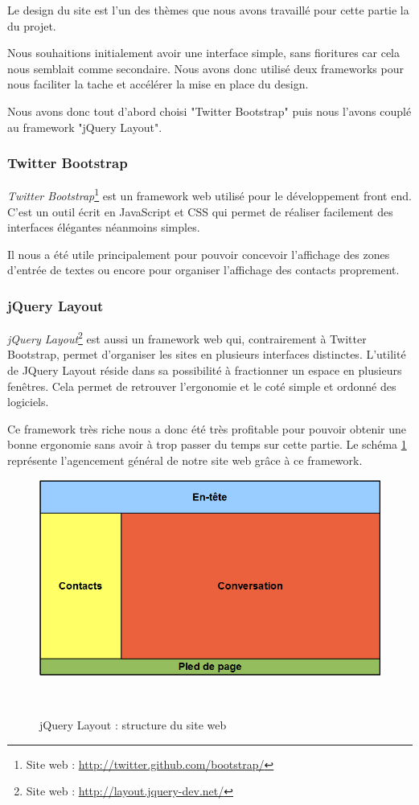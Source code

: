 Le design du site est l'un des thèmes que nous avons travaillé pour cette partie la du projet.

Nous souhaitions initialement avoir une interface simple, sans fioritures car cela nous semblait comme
secondaire. Nous avons donc utilisé deux frameworks pour nous faciliter la tache et accélérer la mise
en place du design.

Nous avons donc tout d'abord choisi "Twitter Bootstrap" puis nous l'avons couplé au framework "jQuery
Layout".
\\


\subsubsection{Twitter Bootstrap}

\textit{Twitter Bootstrap}\footnote{Site web : \href{http://twitter.github.com/bootstrap/}{http://twitter.github.com/bootstrap/}} est un framework web utilisé pour le développement front end.
C'est un outil écrit en JavaScript et CSS qui permet de réaliser facilement des interfaces élégantes néanmoins simples. 

Il nous a été utile principalement pour pouvoir concevoir l'affichage des zones d'entrée de textes ou 
encore pour organiser l'affichage des contacts proprement.
\\


\subsubsection{jQuery Layout}

\textit{jQuery Layout}\footnote{Site web : \href{http://layout.jquery-dev.net/}{http://layout.jquery-dev.net/}} est aussi un framework web qui, contrairement à Twitter Bootstrap, permet d'organiser les sites en plusieurs interfaces distinctes. 
L'utilité de JQuery Layout réside dans sa possibilité à fractionner un espace en plusieurs fenêtres.
Cela permet de retrouver l'ergonomie et le coté simple et ordonné des logiciels. 

Ce framework très riche nous a donc été très profitable pour pouvoir obtenir une bonne ergonomie sans avoir
à trop passer du temps sur cette partie.
Le schéma \ref{siteWeb_jQueryLayout} représente l'agencement général de notre site web grâce à ce framework.

\begin{figure}[!h]
	\center
	\includegraphics[width=13cm]{img/siteWeb_jQueryLayout.png}
	\caption{jQuery Layout : structure du site web}
	\label{siteWeb_jQueryLayout}
~~\\
\end{figure}
